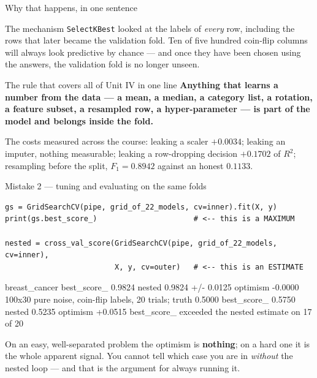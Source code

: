\documentclass[aspectratio=169]{beamer}
\begin{document}
\begin{frame}[shrink=6]{Why that happens, in one sentence}
  \begin{block}{The mechanism}
    \texttt{SelectKBest} looked at the labels of \emph{every} row, including
    the rows that later became the validation fold. Ten of five hundred
    coin-flip columns will always look predictive by chance --- and once they
    have been chosen using the answers, the validation fold is no longer
    unseen.
  \end{block}
  \begin{alertblock}{The rule that covers all of Unit IV in one line}
    \textbf{Anything that learns a number from the data --- a mean, a median,
    a category list, a rotation, a feature subset, a resampled row, a
    hyper-parameter --- is part of the model and belongs inside the fold.}
  \end{alertblock}
  \begin{center}
    \small The costs measured across the course: leaking a scaler $+0.0034$;
    leaking an imputer, nothing measurable; leaking a row-dropping decision
    $+0.1702$ of $R^2$; resampling before the split, $F_1 = 0.8942$ against
    an honest $0.1133$.
  \end{center}
\end{frame}

\begin{frame}[fragile,shrink=4]{Mistake 2 --- tuning and evaluating on the same folds}
\begin{lstlisting}
gs = GridSearchCV(pipe, grid_of_22_models, cv=inner).fit(X, y)
print(gs.best_score_)                      # <-- this is a MAXIMUM

nested = cross_val_score(GridSearchCV(pipe, grid_of_22_models, cv=inner),
                         X, y, cv=outer)   # <-- this is an ESTIMATE
\end{lstlisting}
\begin{outblk}
breast_cancer   best_score_ 0.9824   nested 0.9824 +/- 0.0125
                optimism    -0.0000
100x30 pure noise, coin-flip labels, 20 trials; truth 0.5000
  best_score_ 0.5750   nested 0.5235   optimism +0.0515
  best_score_ exceeded the nested estimate on 17 of 20
\end{outblk}
  \begin{center}
    \small On an easy, well-separated problem the optimism is
    \textbf{nothing}; on a hard one it is the whole apparent signal. You
    cannot tell which case you are in \emph{without} the nested loop --- and
    that is the argument for always running it.
  \end{center}
\end{frame}
\end{document}
